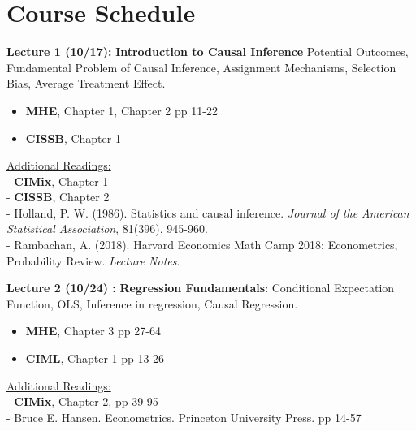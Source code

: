 \documentclass[12pt]{article}
\begin{document}
\section*{Course Schedule}

\vspace{2em}
\noindent\textbf{Lecture 1 (10/17):} \textbf{Introduction to Causal Inference} Potential Outcomes, Fundamental Problem of Causal Inference, Assignment Mechanisms, Selection Bias, Average Treatment Effect. \\
\vspace{1em}
\begin{itemize}
    \item \textbf{MHE}, Chapter 1, Chapter 2 pp 11-22
    \item  \textbf{CISSB}, Chapter 1 \\
\end{itemize}
\vspace{1em}
\underline{Additional Readings:} \\
\hspace{1em} - \textbf{CIMix}, Chapter 1 \\
\hspace{1em} - \textbf{CISSB}, Chapter 2 \\
\hspace{1em} - Holland, P. W. (1986). Statistics and causal inference. \textit{Journal of the American Statistical Association}, 81(396), 945-960.\\
\hspace{1em} - Rambachan, A. (2018). Harvard Economics Math Camp 2018: Econometrics, Probability Review. \textit{Lecture Notes}.

\vspace{2em}
\noindent\textbf{Lecture 2 (10/24) :}  \textbf{Regression Fundamentals}: Conditional Expectation Function, OLS, Inference in regression, Causal Regression.\\
\vspace{1em}
\begin{itemize}
    \item \textbf{MHE}, Chapter 3 pp 27-64
    \item \textbf{CIML}, Chapter 1 pp 13-26
\end{itemize}

\underline{Additional Readings:} \\
\vspace{1em} - \textbf{CIMix}, Chapter 2, pp 39-95 \\
\hspace{1em} - Bruce E. Hansen. Econometrics. Princeton University Press. pp 14-57
\end{document}
